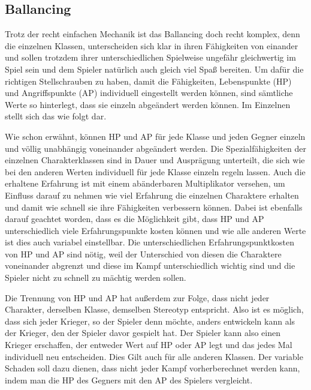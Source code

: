 \subsection{Ballancing} Trotz der recht einfachen Mechanik ist das Ballancing doch recht komplex, denn die einzelnen Klassen, unterscheiden sich klar in ihren Fähigkeiten von einander und sollen trotzdem ihrer unterschiedlichen Spielweise ungefähr gleichwertig im Spiel sein und dem Spieler natürlich auch gleich viel Spaß bereiten. Um dafür die richtigen Stellschrauben zu haben, damit die Fähigkeiten, Lebenspunkte (HP) und Angriffspunkte (AP) individuell eingestellt werden können, sind sämtliche Werte so hinterlegt, dass sie einzeln abgeändert werden können. Im Einzelnen stellt sich das wie folgt dar. 

Wie schon erwähnt, können HP und AP für jede Klasse und jeden Gegner einzeln und völlig unabhängig voneinander abgeändert werden. Die Spezialfähigkeiten der einzelnen Charakterklassen sind in Dauer und Ausprägung unterteilt, die sich wie bei den anderen Werten individuell für jede Klasse einzeln regeln lassen. Auch die erhaltene Erfahrung ist mit einem abänderbaren Multiplikator versehen, um Einfluss darauf zu nehmen wie viel Erfahrung die einzelnen Charaktere erhalten und damit wie schnell sie ihre Fähigkeiten verbessern können. Dabei ist ebenfalls darauf geachtet worden, dass es die Möglichkeit gibt, dass HP und AP unterschiedlich viele Erfahrungspunkte kosten können und wie alle anderen Werte ist dies auch variabel einstellbar. Die unterschiedlichen Erfahrungspunktkosten von HP und AP sind nötig, weil der Unterschied von diesen die Charaktere voneinander abgrenzt und diese im Kampf unterschiedlich wichtig sind und die Spieler nicht zu schnell zu mächtig werden sollen.

Die Trennung von HP und AP hat außerdem zur Folge, dass nicht jeder Charakter, derselben Klasse, demselben Stereotyp entspricht. Also ist es möglich, dass sich jeder Krieger, so der Spieler denn möchte, anders entwickeln kann als der Krieger, den der Spieler davor gespielt hat. Der Spieler kann also einen Krieger erschaffen, der entweder Wert auf HP oder AP legt und das jedes Mal individuell neu entscheiden. Dies Gilt auch für alle anderen Klassen. Der variable Schaden soll dazu dienen, dass nicht jeder Kampf vorherberechnet werden kann, indem man die HP des Gegners mit den AP des Spielers vergleicht.


